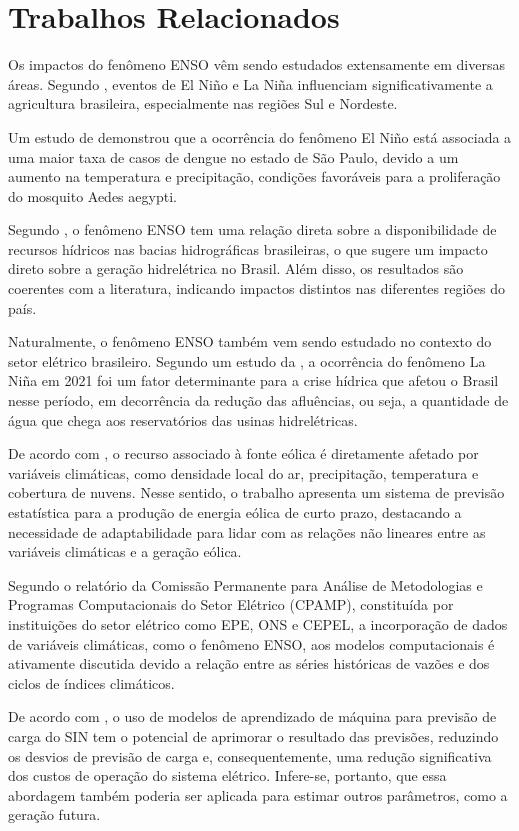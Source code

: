 \chapter{Trabalhos Relacionados}
Os impactos do fenômeno ENSO vêm sendo estudados extensamente em diversas áreas. Segundo , eventos
de El Niño e La Niña influenciam significativamente a agricultura brasileira, especialmente nas regiões Sul e Nordeste.

Um estudo de  demonstrou que a ocorrência do fenômeno El Niño está associada a uma maior taxa de 
casos de dengue no estado de São Paulo, devido a um aumento na temperatura e precipitação, condições
favoráveis para a proliferação do mosquito Aedes aegypti.

Segundo , o fenômeno ENSO tem uma relação direta sobre a disponibilidade de recursos hídricos
nas bacias hidrográficas brasileiras, o que sugere um impacto direto sobre a geração hidrelétrica no Brasil. Além disso,
os resultados são coerentes com a literatura, indicando impactos distintos nas diferentes regiões do país.

Naturalmente, o fenômeno ENSO também vem sendo estudado no contexto do setor elétrico brasileiro. Segundo um
estudo da , a ocorrência do fenômeno La Niña em 2021 foi um fator determinante para a crise hídrica
que afetou o Brasil nesse período, em decorrência da redução das afluências, ou seja, a quantidade de água que chega aos
reservatórios das usinas hidrelétricas.

De acordo com , o recurso associado à fonte eólica é diretamente afetado por variáveis climáticas,
como densidade local do ar, precipitação, temperatura e cobertura de nuvens. Nesse sentido, o trabalho apresenta um sistema de 
previsão estatística para a produção de energia eólica de curto prazo, destacando a necessidade de adaptabilidade 
para lidar com as relações não lineares entre as variáveis climáticas e a geração eólica.

Segundo o relatório da Comissão Permanente para Análise de Metodologias e Programas Computacionais do Setor Elétrico (CPAMP),
constituída por instituições do setor elétrico como EPE, ONS e CEPEL, a incorporação de dados de variáveis climáticas,
como o fenômeno ENSO, aos modelos computacionais é ativamente discutida devido a relação entre as séries históricas de 
vazões e dos ciclos de índices climáticos. \cite{cpamp2019}

De acordo com , o uso de modelos de aprendizado de máquina para previsão de carga do SIN tem o
potencial de aprimorar o resultado das previsões, reduzindo os desvios de previsão de carga e, consequentemente, uma redução 
significativa dos custos de operação do sistema elétrico. Infere-se, portanto, que essa abordagem também poderia
ser aplicada para estimar outros parâmetros, como a geração futura.

